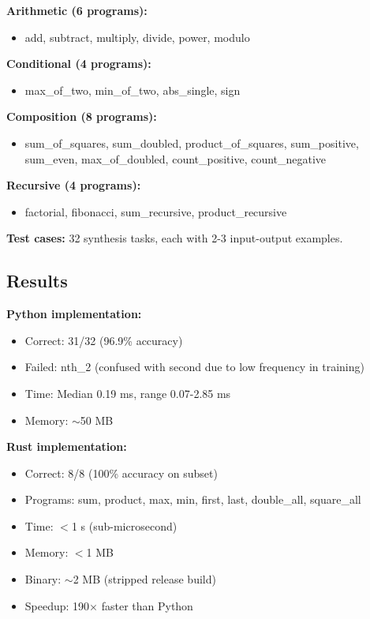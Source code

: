 \documentclass[twocolumn,10pt]{article}
\theoremstyle{definition}
\theoremstyle{remark}
\begin{document}
\textbf{Arithmetic (6 programs):}
\begin{itemize}
\item add, subtract, multiply, divide, power, modulo
\end{itemize}

\textbf{Conditional (4 programs):}
\begin{itemize}
\item max\_of\_two, min\_of\_two, abs\_single, sign
\end{itemize}

\textbf{Composition (8 programs):}
\begin{itemize}
\item sum\_of\_squares, sum\_doubled, product\_of\_squares, sum\_positive, sum\_even, max\_of\_doubled, count\_positive, count\_negative
\end{itemize}

\textbf{Recursive (4 programs):}
\begin{itemize}
\item factorial, fibonacci, sum\_recursive, product\_recursive
\end{itemize}

\textbf{Test cases:} 32 synthesis tasks, each with 2-3 input-output examples.

\subsection{Results}

\textbf{Python implementation:}
\begin{itemize}
\item Correct: 31/32 (96.9\% accuracy)
\item Failed: nth\_2 (confused with second due to low frequency in training)
\item Time: Median 0.19 ms, range 0.07-2.85 ms
\item Memory: $\sim$50 MB
\end{itemize}

\textbf{Rust implementation:}
\begin{itemize}
\item Correct: 8/8 (100\% accuracy on subset)
\item Programs: sum, product, max, min, first, last, double\_all, square\_all
\item Time: $<$1 \textmu s (sub-microsecond)
\item Memory: $<$1 MB
\item Binary: $\sim$2 MB (stripped release build)
\item Speedup: 190$\times$ faster than Python
\end{itemize}
\end{document}
